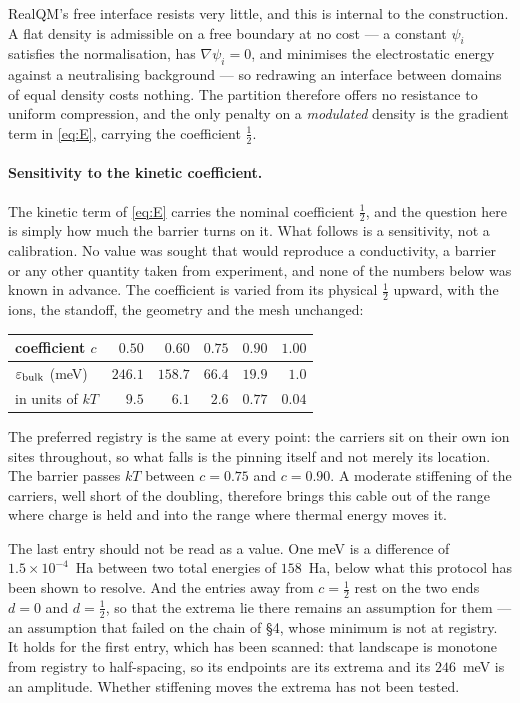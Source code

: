 \documentclass[11pt]{article}
\newcommand{\grad}{\nabla}
\newcommand{\half}{\tfrac12}
\begin{document}
RealQM's free interface resists very little, and this is internal to the construction. A flat density
is admissible on a free boundary at no cost --- a constant $\psi_i$ satisfies the normalisation, has
$\grad\psi_i=0$, and minimises the electrostatic energy against a neutralising background --- so
redrawing an interface between domains of equal density costs nothing. The partition therefore offers
no resistance to uniform compression, and the only penalty on a \emph{modulated} density is the
gradient term in \eqref{eq:E}, carrying the coefficient $\half$.

\paragraph{Sensitivity to the kinetic coefficient.} The kinetic term of \eqref{eq:E} carries the
nominal coefficient $\half$, and the question here is simply how much the barrier turns on it. What
follows is a sensitivity, not a calibration. No value was sought that would reproduce a conductivity, a barrier
or any other quantity taken from experiment, and none of the numbers below was known in advance.
The coefficient is varied from its physical $\half$ upward, with the ions, the standoff, the
geometry and the mesh unchanged:

\begin{center}
\small
\begin{tabular}{@{}lrrrrr@{}}
\toprule
coefficient $c$ & $0.50$ & $0.60$ & $0.75$ & $0.90$ & $1.00$\\
\midrule
$\varepsilon_{\rm bulk}$ (meV) & $246.1$ & $158.7$ & $66.4$ & $19.9$ & $1.0$\\
in units of $kT$ & $9.5$ & $6.1$ & $2.6$ & $0.77$ & $0.04$\\
\bottomrule
\end{tabular}
\end{center}

\noindent The preferred registry is the same at every point: the carriers sit on their own ion
sites throughout, so what falls is the pinning itself and not merely its location. The barrier
passes $kT$ between $c=0.75$ and $c=0.90$. A moderate stiffening of the carriers, well short of
the doubling, therefore brings this cable out of the range where charge is held and into the range
where thermal energy moves it.

The last entry should not be read as a value. One meV is a difference of $1.5\times10^{-4}$~Ha
between two total energies of $158$~Ha, below what this protocol has been shown to resolve. And the
entries away from $c=\half$ rest on the two ends $d=0$ and $d=\half$, so that the extrema lie there
remains an assumption for them --- an assumption that failed on the chain of \S4, whose minimum is
not at registry. It holds for the first entry, which has been scanned: that landscape is monotone
from registry to half-spacing, so its endpoints are its extrema and its $246$~meV is an amplitude.
Whether stiffening moves the extrema has not been tested.
\end{document}
